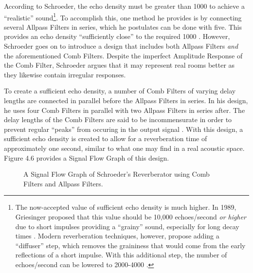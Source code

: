 According to Schroeder, the echo density must be greater than 1000 to achieve a ``realistic'' sound\footnote{The now-accepted value of sufficient echo density is much higher. In 1989, Griesinger proposed that this value should be 10,000 echoes/second \textit{or higher} due to short impulses providing a ``grainy'' sound, especially for long decay times \cite{griesinger1989practical}. Modern reverberation techniques, however, propose adding a ``diffuser'' step, which removes the graininess that would come from the early reflections of a short impulse. With this additional step, the number of echoes/second can be lowered to 2000-4000 \cite{FiftyYears}.}. To accomplish this, one method he provides is by connecting several Allpass Filters in series, which he postulates can be done with five. This provides an echo density ``sufficiently close'' to the required 1000 \cite{schroeder1961natural}. However, Schroeder goes on to introduce a design that includes both Allpass Filters \textit{and} the aforementioned Comb Filters. Despite the imperfect Amplitude Response of the Comb Filter, Schroeder argues that it may represent real rooms better as they likewise contain irregular responses.

To create a sufficient echo density, a number of Comb Filters of varying delay lengths are connected in parallel before the Allpass Filters in series. In his design, he uses four Comb Filters in parallel with two Allpass Filters in series after. The delay lengths of the Comb Filters are said to be incommensurate in order to prevent regular ``peaks'' from occuring in the output signal \cite{schroeder1961natural}. With this design, a sufficient echo density is created to allow for a reverberation time of approximately one second, similar to what one may find in a real acoustic space. Figure 4.6 provides a Signal Flow Graph of this design.

\begin{figure}[h]
	\begin{center}
	\caption{A Signal Flow Graph of Schroeder's Reverberator using Comb Filters and Allpass Filters.}
	\end{center}
\end{figure}

